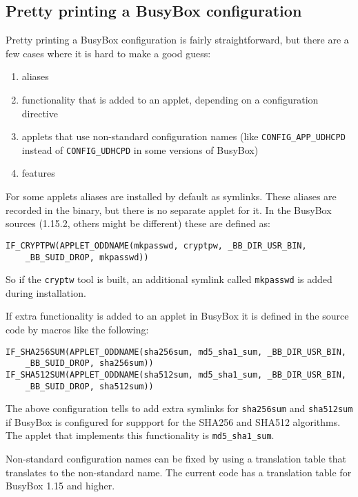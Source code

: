 \documentclass[10pt,a4paper]{article}
\begin{document}
\subsection{Pretty printing a BusyBox configuration}

Pretty printing a BusyBox configuration is fairly straightforward, but there
are a few cases where it is hard to make a good guess:

\begin{enumerate}
\item aliases
\item functionality that is added to an applet, depending on a configuration
directive
\item applets that use non-standard configuration names (like
\texttt{CONFIG\_APP\_UDHCPD} instead of \texttt{CONFIG\_UDHCPD} in some
versions of BusyBox)
\item features
\end{enumerate}

For some applets aliases are installed by default as symlinks. These aliases
are recorded in the binary, but there is no separate applet for it. In the
BusyBox sources (1.15.2, others might be different) these are defined as:

\begin{verbatim}
IF_CRYPTPW(APPLET_ODDNAME(mkpasswd, cryptpw, _BB_DIR_USR_BIN,
    _BB_SUID_DROP, mkpasswd))
\end{verbatim}

So if the \texttt{cryptw} tool is built, an additional symlink called
\texttt{mkpasswd} is added during installation.

If extra functionality is added to an applet in BusyBox it is defined in the
source code by macros like the following:

\begin{verbatim}
IF_SHA256SUM(APPLET_ODDNAME(sha256sum, md5_sha1_sum, _BB_DIR_USR_BIN,
    _BB_SUID_DROP, sha256sum))
IF_SHA512SUM(APPLET_ODDNAME(sha512sum, md5_sha1_sum, _BB_DIR_USR_BIN,
    _BB_SUID_DROP, sha512sum))
\end{verbatim}

The above configuration tells to add extra symlinks for \texttt{sha256sum} and
\texttt{sha512sum} if BusyBox is configured for suppport for the SHA256 and
SHA512 algorithms. The applet that implements this functionality is
\texttt{md5\_sha1\_sum}.

Non-standard configuration names can be fixed by using a translation table that
translates to the non-standard name. The current code has a translation table
for BusyBox 1.15 and higher.
\end{document}
